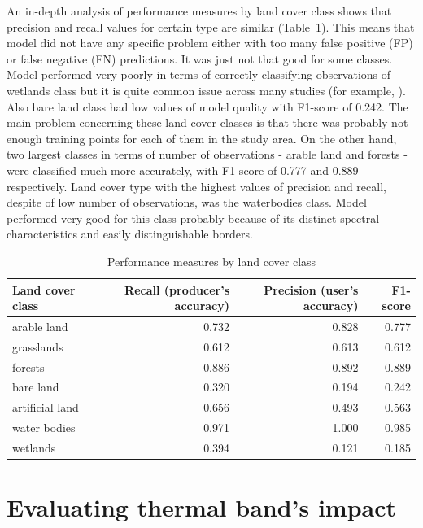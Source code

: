 \documentclass{amuthesis}
\begin{document}
An in-depth analysis of performance measures by land cover class shows
that precision and recall values for certain type are similar
(Table~\ref{tbl-tabela5}). This means that model did not have any
specific problem either with too many false positive (FP) or false
negative (FN) predictions. It was just not that good for some classes.
Model performed very poorly in terms of correctly classifying
observations of wetlands class but it is quite common issue across many
studies (for example, \textcite{malinowski_automated_2020}). Also bare
land class had low values of model quality with F1-score of 0.242. The
main problem concerning these land cover classes is that there was
probably not enough training points for each of them in the study area.
On the other hand, two largest classes in terms of number of
observations - arable land and forests - were classified much more
accurately, with F1-score of 0.777 and 0.889 respectively. Land cover
type with the highest values of precision and recall, despite of low
number of observations, was the waterbodies class. Model performed very
good for this class probably because of its distinct spectral
characteristics and easily distinguishable borders.

\hypertarget{tbl-tabela5}{}
\begin{table}
\caption{\label{tbl-tabela5}Performance measures by land cover class }\tabularnewline

\centering
\begin{tabular}{|>{}l|>{}r|>{}r|>{}r|}
\toprule
\textbf{Land cover class} & \textbf{Recall (producer's accuracy)} & \textbf{Precision (user's accuracy)} & \textbf{F1-score}\\
\midrule
arable land & 0.732 & 0.828 & 0.777\\
\hline
grasslands & 0.612 & 0.613 & 0.612\\
\hline
forests & 0.886 & 0.892 & 0.889\\
\hline
bare land & 0.320 & 0.194 & 0.242\\
\hline
artificial land & 0.656 & 0.493 & 0.563\\
\hline
water bodies & 0.971 & 1.000 & 0.985\\
\hline
wetlands & 0.394 & 0.121 & 0.185\\
\bottomrule
\end{tabular}
\end{table}


\hypertarget{sec-results-therm}{%
\chapter{Evaluating thermal band's impact}\label{sec-results-therm}}
\end{document}
